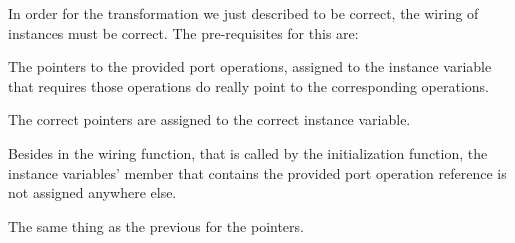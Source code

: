 In order for the transformation we just described to be correct, the wiring of instances must be correct. The pre-requisites for this are:
\begin{compactenum}
\item The pointers to the provided port operations, assigned to the instance variable that requires those operations do really point to the corresponding operations.
\item The correct pointers are assigned to the correct instance variable.
\item Besides in the wiring function, that is called by the initialization function, the instance variables' member that contains the provided port operation reference is not assigned anywhere else.
\item The same thing as the previous for the pointers.
\end{compactenum}























